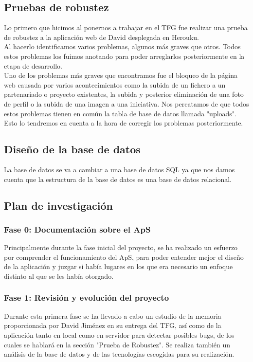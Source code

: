 \documentclass{article}
\begin{document}
\subsection{Pruebas de robustez}
Lo primero que hicimos al ponernos a trabajar en el TFG fue realizar una prueba de robustez a la aplicación web de David desplegada en Herouku.\\
Al hacerlo identificamos varios problemas, algunos más graves que otros. Todos estos problemas los fuimos anotando para poder arreglarlos posteriormente en la etapa de desarrollo.\\
Uno de los problemas más graves que encontramos fue el bloqueo de la página web causada por varios acontecimientos como la subida de un fichero a un partenariado o proyecto existentes, la subida y posterior eliminación de una foto de perfil o la subida de una imagen a una iniciativa. Nos percatamos de que todos estos problemas tienen en común la tabla de base de datos llamada "uploads". Esto lo tendremos en cuenta a la hora de corregir los problemas 
posteriormente.

\subsection{Diseño de la base de datos}
La base de datos se va a cambiar a una base de datos SQL ya que nos damos cuenta que la estructura de la base de datos es una base de datos relacional.

\subsection{Plan de investigación}
\subsubsection{Fase 0: Documentación sobre el ApS}
Principalmente durante la fase inicial del proyecto, se ha realizado un esfuerzo por comprender el funcionamiento del ApS, para poder entender mejor el diseño de la aplicación y juzgar si había lugares en los que era necesario un enfoque distinto al que se les había otorgado. 
\subsubsection{Fase 1: Revisión y evolución del proyecto}
Durante esta primera fase se ha llevado a cabo un estudio de la memoria proporcionada por David Jiménez en su entrega del TFG, así como de la aplicación tanto en local como en servidor para detectar posibles bugs, de los cuales se hablará en la sección "Prueba de Robustez".
Se realiza también un análisis de la base de datos y de las tecnologías escogidas para su realización.
\end{document}
